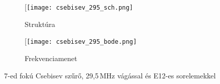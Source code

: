 \begin{figure}[!ht]
	\centering
	\begin{subfigure}[b]{\textwidth}
		\centering
		\centerline{[\texttt{[image: csebisev\_295\_sch.png]}}
		\label{fig:csebisev_295_sch}
		\caption{Struktúra}
	\end{subfigure}
	\hfill
	\begin{subfigure}[b]{\textwidth}
		\centering
		\centerline{[\texttt{[image: csebisev\_295\_bode.png]}}
		\label{fig:csebisev_295_bode}
		\caption{Frekvenciamenet}
	\end{subfigure}
	\caption{7-ed fokú Csebisev szűrő, 29,5\,MHz vágással és E12-es sorelemekkel}
	\label{fig:csebisev_295}
\end{figure}

\newpage
